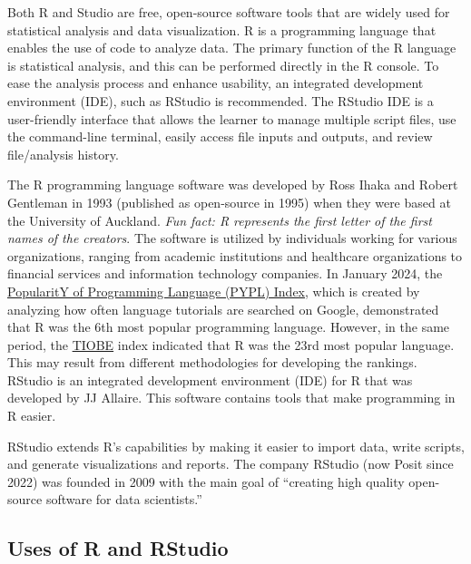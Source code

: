 \documentclass[
  letterpaper,
  DIV=11,
  numbers=noendperiod]{scrreprt}
\begin{document}
Both R and Studio are free, open-source software tools that are widely
used for statistical analysis and data visualization. R is a programming
language that enables the use of code to analyze data. The primary
function of the R language is statistical analysis, and this can be
performed directly in the R console. To ease the analysis process and
enhance usability, an integrated development environment (IDE), such as
RStudio is recommended. The RStudio IDE is a user-friendly interface
that allows the learner to manage multiple script files, use the
command-line terminal, easily access file inputs and outputs, and review
file/analysis history.

The R programming language software was developed by Ross Ihaka and
Robert Gentleman in 1993 (published as open-source in 1995) when they
were based at the University of Auckland. \emph{Fun fact: R represents
the first letter of the first names of the creators}. The software is
utilized by individuals working for various organizations, ranging from
academic institutions and healthcare organizations to financial services
and information technology companies. In January 2024, the
\href{https://pypl.github.io/PYPL.html}{PopularitY of Programming
Language (PYPL) Index}, which is created by analyzing how often language
tutorials are searched on Google, demonstrated that R was the 6th most
popular programming language. However, in the same period, the
\href{https://www.tiobe.com/tiobe-index/}{TIOBE} index indicated that R
was the 23rd most popular language. This may result from different
methodologies for developing the rankings. RStudio is an integrated
development environment (IDE) for R that was developed by JJ Allaire.
This software contains tools that make programming in R easier.

RStudio extends R's capabilities by making it easier to import data,
write scripts, and generate visualizations and reports. The company
RStudio (now Posit since 2022) was founded in 2009 with the main goal of
``creating high quality open-source software for data scientists.''

\subsection{Uses of R and RStudio}\label{uses-of-r-and-rstudio}
\end{document}
